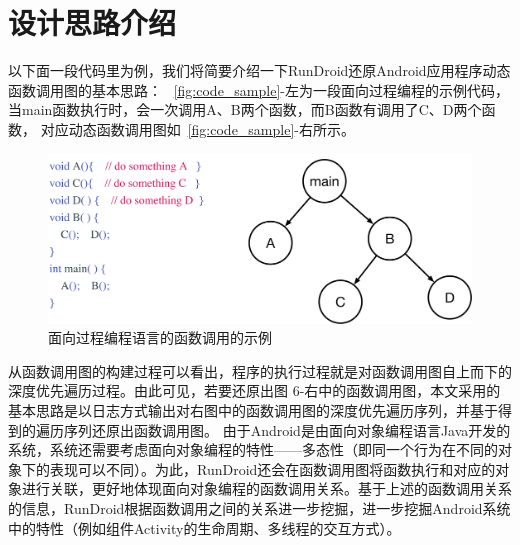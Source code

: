 
\section{设计思路介绍}
以下面一段代码里为例，我们将简要介绍一下RunDroid还原Android应用程序动态函数调用图的基本思路：
~\autoref{fig:code_sample}-左为一段面向过程编程的示例代码，当main函数执行时，会一次调用A、B两个函数，而B函数有调用了C、D两个函数，
对应动态函数调用图如~\autoref{fig:code_sample}-右所示。
 
 
 \begin{figure}
	\centering
	\includegraphics[width=\textwidth]{./Figures/code-sample.png}
	\caption{ 面向过程编程语言的函数调用的示例}
	\label{fig:code_sample}
\end{figure}


从函数调用图的构建过程可以看出，程序的执行过程就是对函数调用图自上而下的深度优先遍历过程。由此可见，若要还原出图 6-右中的函数调用图，本文采用的基本思路是以日志方式输出对右图中的函数调用图的深度优先遍历序列，并基于得到的遍历序列还原出函数调用图。
由于Android是由面向对象编程语言Java开发的系统，系统还需要考虑面向对象编程的特性——多态性（即同一个行为在不同的对象下的表现可以不同）。为此，RunDroid还会在函数调用图将函数执行和对应的对象进行关联，更好地体现面向对象编程的函数调用关系。基于上述的函数调用关系的信息，RunDroid根据函数调用之间的关系进一步挖掘，进一步挖掘Android系统中的特性（例如组件Activity的生命周期、多线程的交互方式）。


